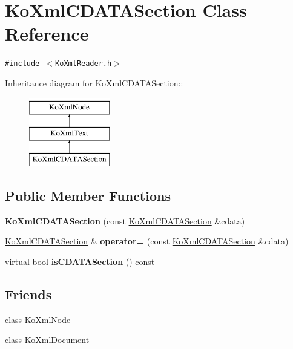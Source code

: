 \hypertarget{classKoXmlCDATASection}{
\section{KoXmlCDATASection Class Reference}
\label{classKoXmlCDATASection}
}
{\tt \#include $<$KoXmlReader.h$>$}

Inheritance diagram for KoXmlCDATASection::\begin{figure}[H]
\begin{center}
\leavevmode
\includegraphics[height=3cm]{classKoXmlCDATASection}
\end{center}
\end{figure}
\subsection*{Public Member Functions}
\begin{CompactItemize}
\item 
\hypertarget{classKoXmlCDATASection_9f69382bc27884731599f49763926343}{
\textbf{KoXmlCDATASection} (const \hyperlink{classKoXmlCDATASection}{KoXmlCDATASection} \&cdata)}
\label{classKoXmlCDATASection_9f69382bc27884731599f49763926343}

\item 
\hypertarget{classKoXmlCDATASection_2380c3e02c07e9f31ee30c97de202c06}{
\hyperlink{classKoXmlCDATASection}{KoXmlCDATASection} \& \textbf{operator=} (const \hyperlink{classKoXmlCDATASection}{KoXmlCDATASection} \&cdata)}
\label{classKoXmlCDATASection_2380c3e02c07e9f31ee30c97de202c06}

\item 
\hypertarget{classKoXmlCDATASection_f5d118d633fa233c8a7c9a3fad7ae5fd}{
virtual bool \textbf{isCDATASection} () const }
\label{classKoXmlCDATASection_f5d118d633fa233c8a7c9a3fad7ae5fd}

\end{CompactItemize}
\subsection*{Friends}
\begin{CompactItemize}
\item 
\hypertarget{classKoXmlCDATASection_6c97883f92c7cbf2ecdf17db6cea8297}{
class \hyperlink{classKoXmlCDATASection_6c97883f92c7cbf2ecdf17db6cea8297}{KoXmlNode}}
\label{classKoXmlCDATASection_6c97883f92c7cbf2ecdf17db6cea8297}

\item 
\hypertarget{classKoXmlCDATASection_7f0a67ef52ddc6542737225a82e4f487}{
class \hyperlink{classKoXmlCDATASection_7f0a67ef52ddc6542737225a82e4f487}{KoXmlDocument}}
\label{classKoXmlCDATASection_7f0a67ef52ddc6542737225a82e4f487}

\end{CompactItemize}


